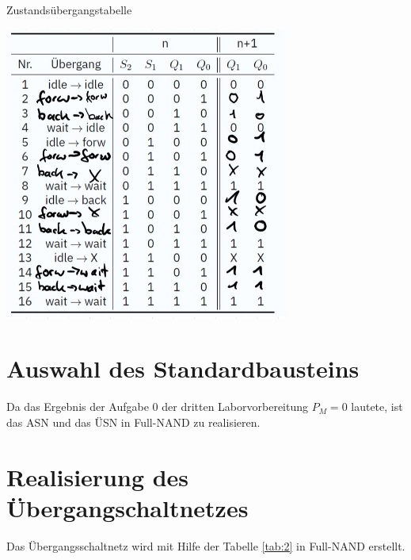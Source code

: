 \documentclass[
    paper=a4,
]{scrartcl}
\begin{document}
    \begin{table}[h]
        \centering
        \caption{Zustandsübergangstabelle}
        \label{tab:2}
        \includegraphics[width=0.7\textwidth]{Zustandsuebergang}
    \end{table}

    \clearpage

\section{Auswahl des Standardbausteins}
    Da das Ergebnis der Aufgabe 0 der dritten Laborvorbereitung \(P_M=0\) lautete, ist das ASN und das ÜSN in Full-NAND zu realisieren.

\section{Realisierung des Übergangschaltnetzes}
    Das Übergangsschaltnetz wird mit Hilfe der Tabelle \ref{tab:2} in Full-NAND erstellt. 
    
\end{document}
